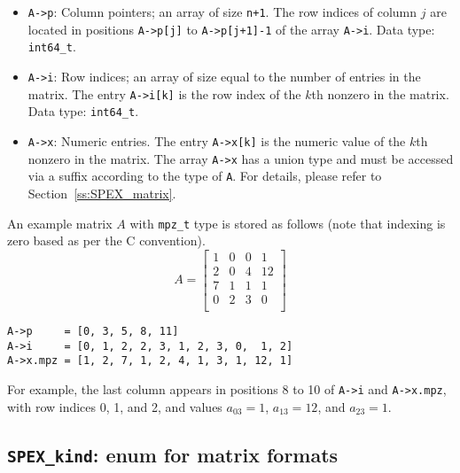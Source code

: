 \documentclass[12pt]{report}
\theoremstyle{definition}
\begin{document}
\begin{itemize}
\item
\verb|A->p|: Column pointers; an array of size \verb|n+1|. The row indices of
column $j$ are located in positions \verb|A->p[j]| to \verb|A->p[j+1]-1| of the
array \verb|A->i|. Data type: \verb|int64_t|.

\item
\verb|A->i|: Row indices; an array of size equal to the number of entries in
the matrix. The entry \verb|A->i[k]| is the row index of the $k$th nonzero in
the matrix. Data type: \verb|int64_t|.

\item
\verb|A->x|: Numeric entries. The entry \verb|A->x[k]| is the numeric value of
the $k$th nonzero in the matrix.  The array \verb|A->x| has a union type and
must be accessed via a suffix according to the type of \verb|A|.  For details,
please refer to Section~\ref{ss:SPEX_matrix}.

\end{itemize}

An example matrix $A$ with \verb|mpz_t| type is stored as follows (note that indexing is zero based as per the C convention).
\[
A = \begin{bmatrix}
1 & 0 & 0 & 1 \\
2 & 0 & 4 & 12 \\
7 & 1 & 1 & 1 \\
0 & 2 & 3 & 0 \\
\end{bmatrix}
\]

\begin{verbatim}
A->p     = [0, 3, 5, 8, 11]
A->i     = [0, 1, 2, 2, 3, 1, 2, 3, 0,  1, 2]
A->x.mpz = [1, 2, 7, 1, 2, 4, 1, 3, 1, 12, 1]
\end{verbatim}

For example, the last column appears in positions 8 to 10 of \verb|A->i| and \verb|A->x.mpz|, with row indices 0, 1, and 2, and values $a_{03}=1$, $a_{13}=12$, and $a_{23}=1$.

\subsection{\texttt{SPEX\_kind}: enum for matrix formats}
\label{ss:SPEX_kind}
\end{document}

